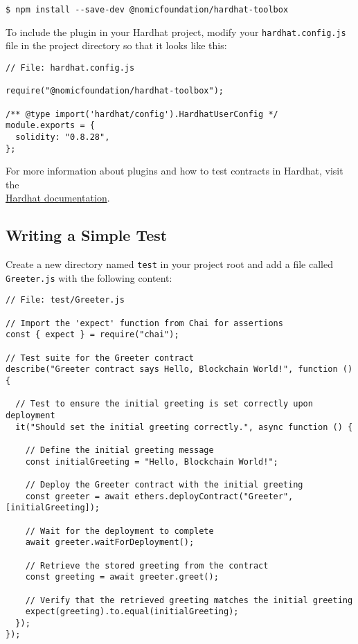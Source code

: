 \documentclass[12pt]{article}
\begin{document}
\begin{verbatim}
$ npm install --save-dev @nomicfoundation/hardhat-toolbox
\end{verbatim}

\noindent
To include the plugin in your Hardhat project, modify your \texttt{hardhat.config.js} file in the project directory so that it looks like this:

\begin{verbatim}
// File: hardhat.config.js

require("@nomicfoundation/hardhat-toolbox");

/** @type import('hardhat/config').HardhatUserConfig */
module.exports = {
  solidity: "0.8.28",
};
\end{verbatim}
For more information about plugins and how to test contracts in Hardhat, visit the
\\ \href{https://hardhat.org/tutorial/testing-contracts}{Hardhat
    documentation}.

\subsection{Writing a Simple Test}

Create a new directory named \texttt{test} in your project root and add a file
called \texttt{Greeter.js} with the following content:

\noindent
\begin{minipage}[c]{\textwidth}
    \begin{verbatim}
// File: test/Greeter.js

// Import the 'expect' function from Chai for assertions
const { expect } = require("chai");

// Test suite for the Greeter contract
describe("Greeter contract says Hello, Blockchain World!", function () {
  
  // Test to ensure the initial greeting is set correctly upon deployment
  it("Should set the initial greeting correctly.", async function () {
    
    // Define the initial greeting message
    const initialGreeting = "Hello, Blockchain World!";
    
    // Deploy the Greeter contract with the initial greeting
    const greeter = await ethers.deployContract("Greeter", [initialGreeting]);
    
    // Wait for the deployment to complete
    await greeter.waitForDeployment();

    // Retrieve the stored greeting from the contract
    const greeting = await greeter.greet();

    // Verify that the retrieved greeting matches the initial greeting
    expect(greeting).to.equal(initialGreeting);
  });
});
\end{verbatim}
\end{minipage}
\end{document}
